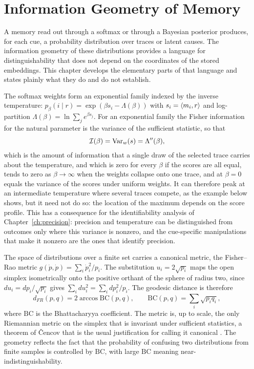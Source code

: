 \chapter{Information Geometry of Memory}\label{ch:geometry}

A memory read out through a softmax or through a Bayesian posterior produces, for each cue, a probability distribution over traces or latent causes. The information geometry of these distributions provides a language for distinguishability that does not depend on the coordinates of the stored embeddings. This chapter develops the elementary parts of that language and states plainly what they do and do not establish.

The softmax weights form an exponential family indexed by the inverse temperature: $p_\beta(i\mid r)=\exp(\beta s_i-\Lambda(\beta))$ with $s_i=\langle m_i,r\rangle$ and log-partition $\Lambda(\beta)=\ln\sum_je^{\beta s_j}$. For an exponential family the Fisher information for the natural parameter is the variance of the sufficient statistic, so that
\begin{equation}\label{eq:fishertemp}
\mathcal I(\beta)=\operatorname{Var}_{w}(s)=\Lambda''(\beta),
\end{equation}
which is the amount of information that a single draw of the selected trace carries about the temperature, and which is zero for every $\beta$ if the scores are all equal, tends to zero as $\beta\to\infty$ when the weights collapse onto one trace, and at $\beta=0$ equals the variance of the scores under uniform weights. It can therefore peak at an intermediate temperature where several traces compete, as the example below shows, but it need not do so: the location of the maximum depends on the score profile. This has a consequence for the identifiability analysis of Chapter~\ref{ch:precision}: precision and temperature can be distinguished from outcomes only where this variance is nonzero, and the cue-specific manipulations that make it nonzero are the ones that identify precision.

The space of distributions over a finite set carries a canonical metric, the Fisher--Rao metric $g(\dot p,\dot p)=\sum_i\dot p_i^2/p_i$. The substitution $u_i=2\sqrt{p_i}$ maps the open simplex isometrically onto the positive orthant of the sphere of radius two, since $du_i=dp_i/\sqrt{p_i}$ gives $\sum_idu_i^2=\sum_idp_i^2/p_i$. The geodesic distance is therefore
\begin{equation}\label{eq:fr}
d_{FR}(p,q)=2\arccos\mathrm{BC}(p,q),\qquad\mathrm{BC}(p,q)=\sum_i\sqrt{p_iq_i},
\end{equation}
where $\mathrm{BC}$ is the Bhattacharyya coefficient. The metric is, up to scale, the only Riemannian metric on the simplex that is invariant under sufficient statistics, a theorem of \v{C}encov that is the usual justification for calling it canonical \cite{amari2016}. The geometry reflects the fact that the probability of confusing two distributions from finite samples is controlled by $\mathrm{BC}$, with large $\mathrm{BC}$ meaning near-indistinguishability.

